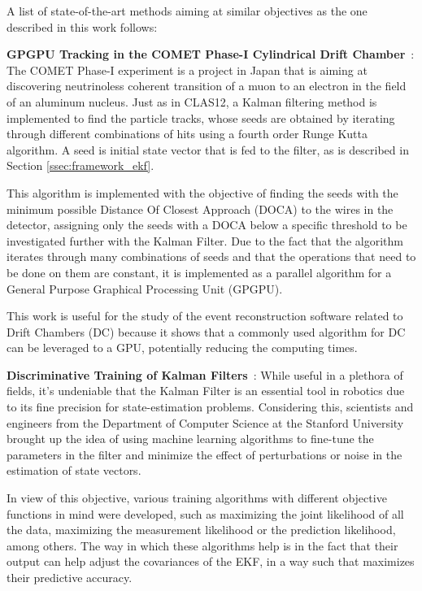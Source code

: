  \label{sec:state_of_the_art}
A list of state-of-the-art methods aiming at similar objectives as the one described in this work follows:

\textbf{GPGPU Tracking in the COMET Phase-I Cylindrical Drift Chamber}~\cite{yeo2019gpgpu}: The COMET Phase-I experiment is a project in Japan that is aiming at discovering neutrinoless coherent transition of a muon to an electron in the field of an aluminum nucleus.
Just as in CLAS12, a Kalman filtering method is implemented to find the particle tracks, whose seeds are obtained by iterating through different combinations of hits using a fourth order Runge Kutta algorithm.
A seed is initial state vector that is fed to the filter, as is described in Section \ref{ssec:framework_ekf}.

This algorithm is implemented with the objective of finding the seeds with the minimum possible Distance Of Closest Approach (DOCA) to the wires in the detector, assigning only the seeds with a DOCA below a specific threshold to be investigated further with the Kalman Filter.
Due to the fact that the algorithm iterates through many combinations of seeds and that the operations that need to be done on them are constant, it is implemented as a parallel algorithm for a General Purpose Graphical Processing Unit (GPGPU).

This work is useful for the study of the event reconstruction software related to Drift Chambers (DC) because it shows that a commonly used algorithm for DC can be leveraged to a GPU, potentially reducing the computing times.

\textbf{Discriminative Training of Kalman Filters}~\cite{abbeel2005discriminative}: While useful in a plethora of fields, it's undeniable that the Kalman Filter is an essential tool in robotics due to its fine precision for state-estimation problems. %
Considering this, scientists and engineers from the Department of Computer Science at the Stanford University brought up the idea of using machine learning algorithms to fine-tune the parameters in the filter and minimize the effect of perturbations or noise in the estimation of state vectors.

In view of this objective, various training algorithms with different objective functions in mind were developed, such as maximizing the joint likelihood of all the data, maximizing the measurement likelihood or the prediction likelihood, among others.
The way in which these algorithms help is in the fact that their output can help adjust the covariances of the EKF, in a way such that maximizes their predictive accuracy.

